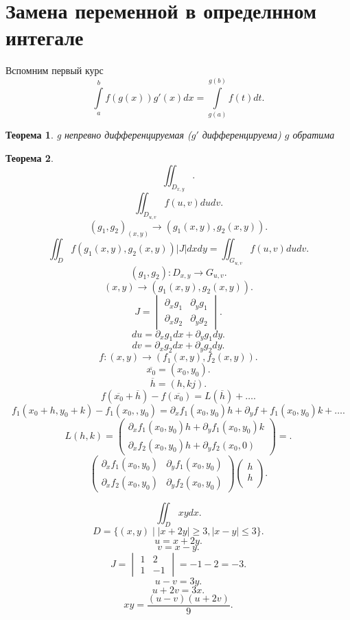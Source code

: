 \documentclass[14pt]{extarticle} \usepackage{fontspec}
\newtheorem{theorem}{Теорема}
\begin{document}
\section{Замена переменной в определнном интегале}
Вспомним первый курс 
\[
\int\limits_{a}^{b} f(g(x)) g'(x) dx  = \int\limits_{g(a)}^{g(b)}  f(t) dt
.\] 
\begin{theorem}
    g непревно дифференцируемая ($g'$ дифференцируема) $g$ обратима
\end{theorem}
\begin{theorem}
    \[
    \iint_{D_{x,y}}
    .\] 
    \[
    \iint_{D_{u,v}} f(u,v) du dv
    .\] 
    \[
        ( g_1,g_2 )_{(x,y)} \to (g_{1}(x,y),g_{2}(x,y))
    .\] 
    \[
    \iint_{D} f(g_1(x,y),g_2(x,y)) |J| dx dy = 
    \iint_{G_{u,v}} f(u,v) du dv
    .\] 
    \[
    ( g_1,g_2 ) :  D_{x,y} \to G_{u,v}
    .\] 
    \[
        (x,y) \to (g_1(x,y),g_2(x,y))
    .\] 
    \[
        J = 
        \begin{vmatrix}
            \partial_{x} g_1 & \partial_{y} g_1\\
            \partial_{x} g_2 & \partial_{y} g_2
        \end{vmatrix} 
    .\] 
    \[
    du = \partial_{x} g_1  dx + \partial_{y} g_1 dy
    .\] 
    \[
    dv = \partial_{x} g_2 dx + \partial_{y} g_2 dy
    .\] 
    \[
    f: (x,y) \to (f_1(x,y),f_2(x,y))
    .\] 
    \[
    \overline{x_0} = (x_0,y_0)
    .\] 
    \[
    \overline{h}=  (h,kj)
    .\] 
    \[
    f(\overline{x_0} + \overline{h}) - f(\overline{x_0}) = L(\overline{h}) + \dots
    .\] 
    \[
    f_1(x_0+h,y_0+k) - f_1(x_0,,y_0) = \partial_{x}f_1(x_0,y_0) h + \partial_{y} f+f_1(x_0,y_0)k + \dots
    .\] 
    \[
  L(h,k) =   \begin{pmatrix} 
    \partial_{x} f_1(x_0,y_0)h + \partial_{y}  f_1(x_0,y_0)k \\
    \partial_{x} f_2(x_0,y_0)h + \partial_{y} f_{2}(x_0,0)
    \end{pmatrix}  =
    .\] 
    \[
    \begin{pmatrix} 
        \partial_{x}  f_1(x_0,y_0)  & \partial_{y} f_1(x_0,y_0) \\
        \partial_{x} f_2(x_0,y_0) & \partial_{y} f_{2}(x_0,y_0) 
    \end{pmatrix} 
    \begin{pmatrix} 
        h\\
        h\\
    \end{pmatrix} 
    .\] 
\end{theorem}
\[
\iint_{D} xy dx
.\] 
\[
    D = \{(x,y)  \mid| x + 2y|  \ge  3, |x - y| \le  3\}
.\] 
\[
u = x + 2y
.\] 
\[
v = x - y
.\] 
\[
J = \begin{vmatrix}
 1 & 2\\
 1 & -1
\end{vmatrix}  = -1 - 2 = -3
.\] 
\[
u - v = 3 y
.\] 
\[
u + 2v = 3 x
.\] 
\[
xy = \frac{(u - v)(u + 2v)}{9}
.\] 
\end{document}
